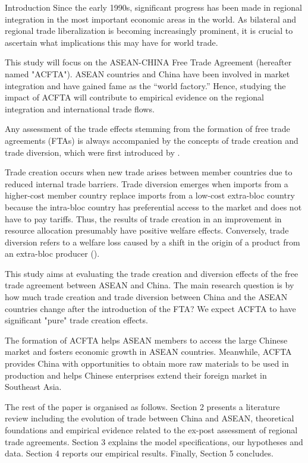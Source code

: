 \begin{section}{Introduction}
Since the early 1990s, significant progress has been made in regional integration in the most important economic areas in the world. As bilateral and regional trade liberalization is becoming increasingly prominent, it is crucial to ascertain what implications this may have for world trade.

This study will focus on the ASEAN-CHINA Free Trade Agreement (hereafter named "ACFTA"). ASEAN countries and China have been involved in market integration and have gained fame as the “world factory.” Hence, studying the impact of ACFTA will contribute to empirical evidence on the regional integration and international trade flows. 

Any assessment of the trade effects stemming from the formation of free trade agreements (FTAs) is always accompanied by the concepts of trade creation and trade diversion, which were first introduced by \cite{viner1950}.

Trade creation occurs when new trade arises between member countries due to reduced internal trade barriers. Trade diversion emerges when imports from a higher-cost member country replace imports from a low-cost extra-bloc country because the intra-bloc country has preferential access to the market and does not have to pay tariffs. Thus, the results of trade creation in an improvement in resource allocation presumably have positive welfare effects. Conversely, trade diversion refers to a welfare loss caused by a shift in the origin of a product from an extra-bloc producer (\cite{carrere_2006}).

This study aims at evaluating the trade creation and diversion effects of the free trade agreement between ASEAN and China. The main research question is by how much trade creation and trade diversion between China and the ASEAN countries change after the introduction of the FTA? We expect ACFTA to have significant "pure" trade creation effects.

The formation of ACFTA helps ASEAN members to access the large Chinese market and fosters economic growth in ASEAN countries. Meanwhile, ACFTA provides China with opportunities to obtain more raw materials to be used in production and helps Chinese enterprises extend their foreign market in Southeast Asia. 

The rest of the paper is organised as follows. Section 2 presents a literature review including the evolution of trade between China and ASEAN, theoretical foundations and empirical evidence related to the ex-post assessment of regional trade agreements. Section 3 explains the model specifications, our hypotheses and data. Section 4 reports our empirical results. Finally, Section 5 concludes.

\end{section}
